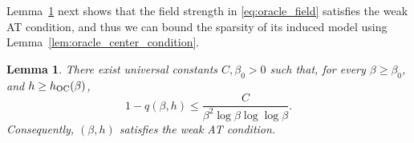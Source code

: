 \documentclass[11pt]{article}
\newtheorem{lemma}{Lemma}
\newcommand{\1}{\mathbf{1}}
\newcommand{\0}{\mathbf{0}}
\newcommand{\OC}{_{\rm OC}}
\begin{document}
Lemma~\ref{lem:oracle_field_scale} next shows that the field strength in \eqref{eq:oracle_field} satisfies the weak AT condition, and thus we can bound the sparsity of its induced model using Lemma~\ref{lem:oracle_center_condition}.

\begin{lemma}
    \label{lem:oracle_field_scale}
    There exist universal constants $C,\beta_0>0$ such that, for every
    $\beta\ge\beta_0$, and $h \ge h\OC(\beta)$,
    \begin{equation}
        \label{eq:oracle_q_rate}
        1-q(\beta, h)
        \le
        \frac{C}{
            \beta^2
            \log\beta
            \log\log\beta
        }.
    \end{equation}
    Consequently, $(\beta,h)$ satisfies the weak AT
    condition.
\end{lemma}
\end{document}
